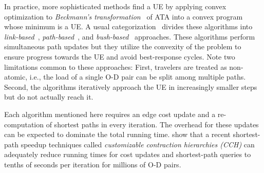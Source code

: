     In practice, more sophisticated methods find a UE by applying convex optimization to \emph{Beckmann's transformation}~\cite{beckmann1956studies} of ATA into a convex program whose minimum is a UE.
    A usual categorization~\cite{florian1995chapter,zhou2010computational,perederieieva2015framework} divides these algorithms into \emph{link-based}~\cite{frank1956algorithm,sheffi1985urban}, \emph{path-based}~\cite{dafermos1968traffic,jayakrishnan1994faster,florian2011new,kumar2011improved}, and \emph{bush-based}~\cite{bargera2002origin,dial2006path,nie2010class} approaches.
    These algorithms perform simultaneous path updates but they utilize the convexity of the problem to ensure progress towards the UE and avoid best-response cycles. 
    Note two limitations common to these approaches:
    First, travelers are treated as non-atomic, i.e., the load of a single O-D pair can be split among multiple paths.
    Second, the algorithms iteratively approach the UE in increasingly smaller steps but do not actually reach it.
    
    Each algorithm mentioned here requires an edge cost update and a re-computation of shortest paths in every iteration.
    The overhead for these updates can be expected to dominate the total running time. 
    \citet{buchhold2019real} show that a recent shortest-path speedup techniques called \emph{customizable contraction hierarchies (CCH)} can adequately reduce running times for cost updates and shortest-path queries to tenths of seconds per iteration for millions of O-D pairs.